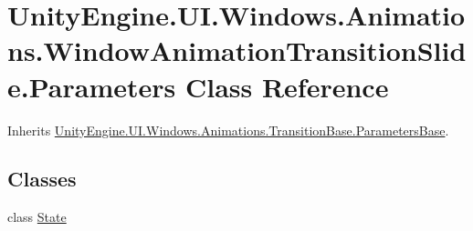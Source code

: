 \hypertarget{class_unity_engine_1_1_u_i_1_1_windows_1_1_animations_1_1_window_animation_transition_slide_1_1_parameters}{}\section{Unity\+Engine.\+U\+I.\+Windows.\+Animations.\+Window\+Animation\+Transition\+Slide.\+Parameters Class Reference}
\label{class_unity_engine_1_1_u_i_1_1_windows_1_1_animations_1_1_window_animation_transition_slide_1_1_parameters}


Inherits \hyperlink{class_unity_engine_1_1_u_i_1_1_windows_1_1_animations_1_1_transition_base_1_1_parameters_base}{Unity\+Engine.\+U\+I.\+Windows.\+Animations.\+Transition\+Base.\+Parameters\+Base}.

\subsection*{Classes}
\begin{DoxyCompactItemize}
\item 
class \hyperlink{class_unity_engine_1_1_u_i_1_1_windows_1_1_animations_1_1_window_animation_transition_slide_1_1_parameters_1_1_state}{State}
\end{DoxyCompactItemize}
